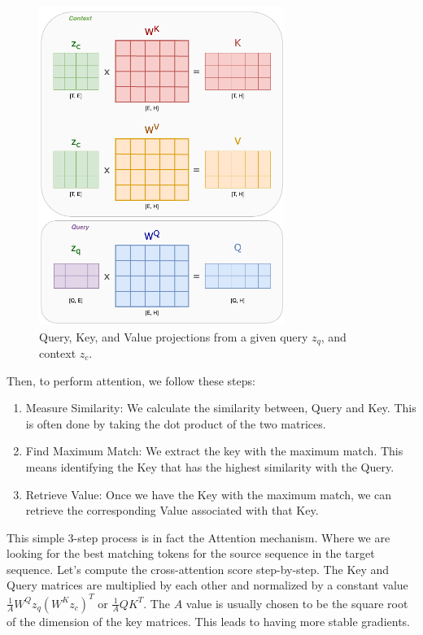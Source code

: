 \begin{figure}[h]
    \centering
    \includegraphics[width=8cm]{pages/imgs/att_kqv.png}
    \caption{Query, Key, and Value projections from a given query $z_q$, and context $z_c$.}
    \label{fig:att_kqv}
\end{figure}

Then, to perform attention, we follow these steps:
\begin{enumerate}
    \item Measure Similarity: We calculate the similarity between, Query and Key. This is often done by taking the dot product of the two matrices.
    \item Find Maximum Match: We extract the key with the maximum match. This means identifying the Key that has the highest similarity with the Query.
    \item Retrieve Value: Once we have the Key with the maximum match, we can retrieve the corresponding Value associated with that Key.
\end{enumerate}

\noindent This simple 3-step process is in fact the Attention mechanism. Where we are looking for the best matching tokens for the source sequence in the target sequence.
Let's compute the cross-attention score step-by-step. The Key and Query matrices are multiplied by each other and normalized by a constant value $\frac{1}{A} W^Q z_q \left(W^K z_c\right)^T$ or $\frac{1}{A} Q K^T$. The $A$ value is usually chosen to be the square root of the dimension of the key matrices. This leads to having more stable gradients.

